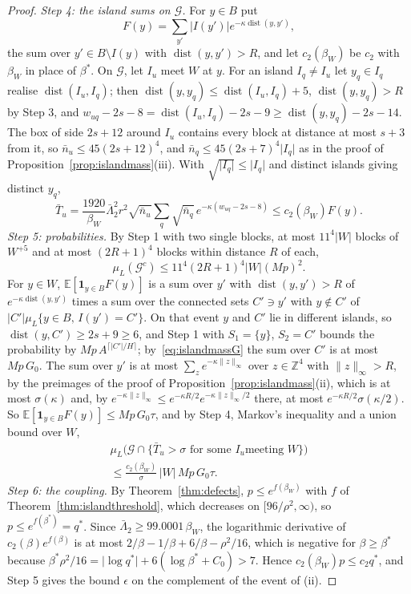 \documentclass[11pt]{amsart}
\theoremstyle{definition}
\theoremstyle{remark}
\numberwithin{equation}{section}
\newcommand{\Z}{\mathbb{Z}}
\newcommand{\E}{\mathbb{E}}
\newcommand{\dist}{\operatorname{dist}}
\begin{document}
\begin{proof}
\emph{Step 4: the island sums on $\mathcal G$.} For $y\in B$ put
\[
F(y)=\sum_{y'}\lvert I(y')\rvert e^{-\kappa\dist(y,y')},
\]
the sum over $y'\in B\setminus I(y)$ with $\dist(y,y')>R$, and let
$c_2(\beta_W)$ be $c_2$ with $\beta_W$ in place of $\beta^*$. On
$\mathcal G$, let $I_u$ meet $W$ at $y$. For an island $I_q\ne I_u$ let
$y_q\in I_q$ realise $\dist(I_u,I_q)$; then $\dist(y,y_q)\le\dist(I_u,I_q)
+5$, $\dist(y,y_q)>R$ by Step 3, and $w_{uq}-2s-8=\dist(I_u,I_q)-2s-9\ge
\dist(y,y_q)-2s-14$. The box of side $2s+12$ around $I_u$ contains every
block at distance at most $s+3$ from it, so $\bar n_u\le45(2s+12)^4$, and
$\bar n_q\le45(2s+7)^4\lvert I_q\rvert$ as in the proof of
Proposition~\ref{prop:islandmass}(iii). With $\sqrt{\lvert I_q\rvert}\le
\lvert I_q\rvert$ and distinct islands giving distinct $y_q$,
\[
\bar T_u=\frac{1920}{\beta_W}\bar\Lambda_2^2r^2\sqrt{\bar n_u}\sum_q
\sqrt{\bar n_q}\,e^{-\kappa(w_{uq}-2s-8)}\le c_2(\beta_W)F(y).
\]
\emph{Step 5: probabilities.} By Step 1 with two single blocks, at most
$11^4\lvert W\rvert$ blocks of $W^{+5}$ and at most $(2R+1)^4$ blocks
within distance $R$ of each,
\[
\mu_L(\mathcal G^c)\le11^4(2R+1)^4\lvert W\rvert(Mp)^2 .
\]
For $y\in W$, $\E[\mathbf 1_{y\in B}F(y)]$ is a sum over $y'$ with
$\dist(y,y')>R$ of $e^{-\kappa\dist(y,y')}$ times a sum over the connected
sets $C'\ni y'$ with $y\notin C'$ of $\lvert C'\rvert\mu_L\{y\in B,\,I(y')=C'\}$.
On that event $y$ and $C'$ lie in different islands, so $\dist(y,C')\ge
2s+9\ge6$, and Step 1 with $S_1=\{y\}$, $S_2=C'$ bounds the probability by
$Mp\,A^{\lceil\lvert C'\rvert/H\rceil}$; by~\eqref{eq:islandmassG} the sum
over $C'$ is at most $Mp\,G_0$. The sum over $y'$ is at most $\sum_z
e^{-\kappa\lVert z\rVert_\infty}$ over $z\in\Z^4$ with $\lVert z
\rVert_\infty>R$, by the preimages of the proof of
Proposition~\ref{prop:islandmass}(ii), which is at most $\sigma(\kappa)$
and, by $e^{-\kappa\lVert z\rVert_\infty}\le e^{-\kappa R/2}e^{-\kappa
\lVert z\rVert_\infty/2}$ there, at most $e^{-\kappa R/2}\sigma(\kappa/2)$.
So $\E[\mathbf 1_{y\in B}F(y)]\le Mp\,G_0\tau$, and by Step 4, Markov's
inequality and a union bound over $W$,
\begin{multline*}
\mu_L\bigl(\mathcal G\cap\{\bar T_u>\sigma\text{ for some }I_u\text{
meeting }W\}\bigr)\\
\le\frac{c_2(\beta_W)}\sigma\,\lvert W\rvert\,Mp\,G_0\tau .
\end{multline*}
\emph{Step 6: the coupling.} By Theorem~\ref{thm:defects}, $p\le e^{f(
\beta_W)}$ with $f$ of Theorem~\ref{thm:islandthreshold}, which decreases
on $[96/\rho^2,\infty)$, so $p\le e^{f(\beta^*)}=q^*$. Since
$\bar\Lambda_2\ge99.0001\,\beta_W$, the logarithmic derivative of
$c_2(\beta)e^{f(\beta)}$ is at most $2/\beta-1/\beta+6/\beta-\rho^2/16$,
which is negative for $\beta\ge\beta^*$ because $\beta^*\rho^2/16=
\lvert\log q^*\rvert+6(\log\beta^*+C_0)>7$. Hence $c_2(\beta_W)p\le
c_2q^*$, and Step 5 gives the bound $\epsilon$ on the complement of the
event of (ii).


\end{proof}
\end{document}
